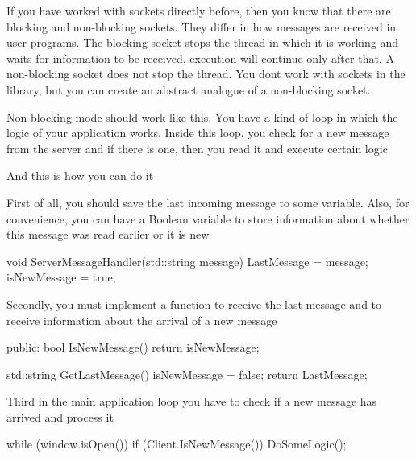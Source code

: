 If you have worked with sockets directly before, then you know that there are blocking and non-\/blocking sockets. They differ in how messages are received in user programs. The blocking socket stops the thread in which it is working and waits for information to be received, execution will continue only after that. A non-\/blocking socket does not stop the thread. You don\textquotesingle{}t work with sockets in the library, but you can create an abstract analogue of a non-\/blocking socket. ~\newline


Non-\/blocking mode should work like this. You have a kind of loop in which the logic of your application works. Inside this loop, you check for a new message from the server and if there is one, then you read it and execute certain logic ~\newline


And this is how you can do it ~\newline


First of all, you should save the last incoming message to some variable. Also, for convenience, you can have a Boolean variable to store information about whether this message was read earlier or it is new ~\newline
 \begin{DoxyVerb}void ServerMessageHandler(std::string message)
{
    LastMessage = message;
    isNewMessage = true;
}
\end{DoxyVerb}
 Secondly, you must implement a function to receive the last message and to receive information about the arrival of a new message ~\newline
 \begin{DoxyVerb}public:
    bool IsNewMessage()
    {
        return isNewMessage;
    }

    std::string GetLastMessage()
    {
        isNewMessage = false;
        return LastMessage;
    }
\end{DoxyVerb}
 Third in the main application loop you have to check if a new message has arrived and process it ~\newline
 \begin{DoxyVerb}while (window.isOpen())
{
    if (Client.IsNewMessage())
    {
        DoSomeLogic();
    }
}
\end{DoxyVerb}
 